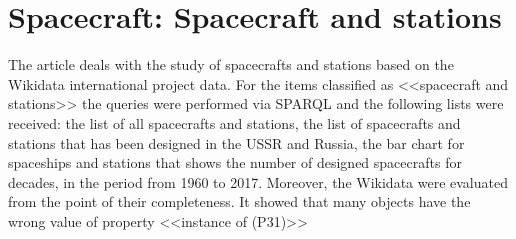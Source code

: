 
\chapter{Spacecraft: Spacecraft and stations}


The article deals with the study of spacecrafts and stations based on the Wikidata international project data. For the items classified as <<spacecraft and stations>> the queries were performed via SPARQL and the following lists were received: the list of all spacecrafts and stations, the list of spacecrafts and stations that has been designed in the USSR and Russia, the bar chart for spaceships and stations that shows the number of designed spacecrafts for decades, in the period from 1960 to 2017. Moreover, the Wikidata were evaluated from the point of their completeness. It showed that many objects have the wrong value of property <<instance of (P31)>>
